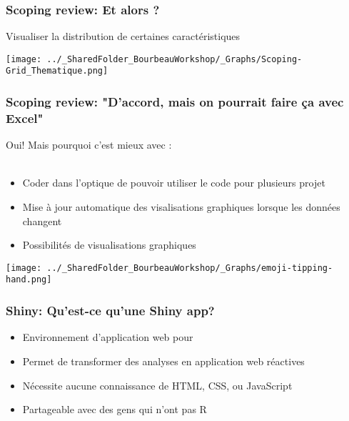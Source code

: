 \documentclass{beamer}
\begin{document}
    

    \begin{frame}
    
      \frametitle{Scoping review: Et \R alors ?} \vspace{1cm}
      
      Visualiser la distribution de certaines caractéristiques
      
     \begin{center}
         \texttt{[image: ../\_SharedFolder\_BourbeauWorkshop/\_Graphs/Scoping-Grid\_Thematique.png]}
        \end{center} 
      
          
    \end{frame} 
    

    \begin{frame}
    
      \frametitle{Scoping review: "D'accord, mais on pourrait faire ça avec Excel"} \vspace{1.5cm}
      
    Oui! Mais pourquoi c'est mieux avec \R: \\~\\
    
        \begin{itemize}
          \item{Coder dans l'optique de pouvoir utiliser le code pour plusieurs projet}
          \item{Mise à jour automatique des visalisations graphiques lorsque les données changent}
          \item{Possibilités de visualisations graphiques}
        \end{itemize}
	
	  \begin{flushright}
     	    \texttt{[image: ../\_SharedFolder\_BourbeauWorkshop/\_Graphs/emoji-tipping-hand.png]}
    \end{flushright} 
          
    \end{frame}  
    

    \begin{frame}
    
      \frametitle{Shiny: Qu'est-ce qu'une Shiny app?} \vspace{1cm}
      
    
    
        \begin{itemize}
          \item{Environnement d'application web pour \R}
          \item{Permet de transformer des analyses en application web réactives}
          \item{Nécessite aucune connaissance de HTML, CSS, ou JavaScript}
          \item{Partageable avec des gens qui n’ont pas R}
        \end{itemize}
          
    \end{frame}  
    
\end{document}

